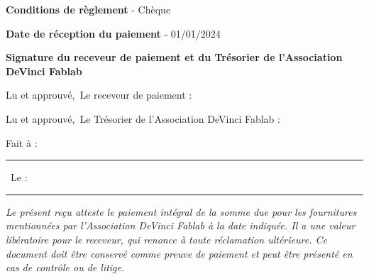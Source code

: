 \documentclass[11pt,a4paper]{article}
\begin{document}
\vspace{0.5cm}

\textbf{Conditions de règlement} - Chèque

\vspace{0.2cm}

\textbf{Date de réception du paiement} - 01/01/2024

\vspace{\fill}
\begin{framed}
    \begin{center}
    \textbf{Signature du receveur de paiement et du Trésorier de l'Association DeVinci Fablab}
    \end{center}
    
    \vspace{0.2cm}
    
    \begin{minipage}[t]{0.45\textwidth}
    \begin{flushleft}
    Lu et approuvé,\
    Le receveur de paiement :\
    \vspace{1.5cm}
    \end{flushleft}
    \end{minipage}\hfill
    \vrule width 0.75pt\hfill
    \begin{minipage}[t]{0.45\textwidth}
    \begin{flushright}
    Lu et approuvé,\
    Le Trésorier de l'Association DeVinci Fablab :\
    \vspace{1.5cm}
    \end{flushright}
    \end{minipage}
    
    \vspace{0.5cm}
    \begin{center}
    Fait à : \rule{3cm}{0.75pt} \
    Le : \rule{3cm}{0.75pt}
    \end{center}
    \end{framed}



\vspace{0.5cm}
\textit{\footnotesize Le présent reçu atteste le paiement intégral de la somme due pour les fournitures mentionnées par l'Association DeVinci Fablab à la date indiquée. Il a une valeur libératoire pour le receveur, qui renonce à toute réclamation ultérieure. Ce document doit être conservé comme preuve de paiement et peut être présenté en cas de contrôle ou de litige. }
\end{document}
